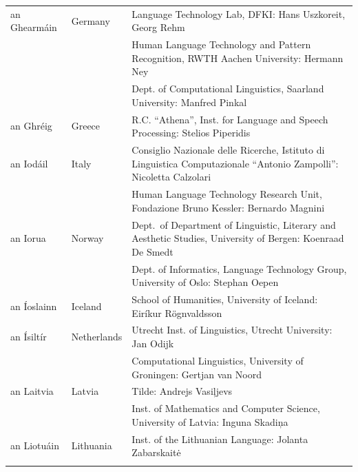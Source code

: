 \begin{longtable}{@{}llp{113mm}@{}}
  an Ghearmáin  & \textcolor{grey1}{Germany} & Language Technology Lab, DFKI: Hans Uszkoreit, Georg Rehm\\ \addlinespace
  & & Human Language Technology and Pattern Recognition, RWTH Aachen University: Hermann Ney \\ \addlinespace
  & & Dept. of Computational Linguistics, Saarland University: Manfred Pinkal\\ \addlinespace
   
  an Ghréig & \textcolor{grey1}{Greece} & R.C. “Athena”, Inst. for Language and Speech Processing: Stelios Piperidis\\ \addlinespace
  
  an Iodáil & \textcolor{grey1}{Italy} & Consiglio Nazionale delle Ricerche, Istituto di Linguistica Computazionale “Antonio Zampolli”: Nicoletta Calzolari\\ \addlinespace
  & & Human Language Technology Research Unit, Fondazione Bruno Kessler: \newline Bernardo Magnini\\ \addlinespace
 
  an Iorua & \textcolor{grey1}{Norway} & Dept.~of Department of Linguistic, Literary and Aesthetic Studies, University of Bergen: Koenraad De Smedt\\ \addlinespace 
  & & Dept. of Informatics, Language Technology Group, University of Oslo: \newline Stephan Oepen \\ \addlinespace
  
  an Íoslainn & \textcolor{grey1}{Iceland} & School of Humanities, University of Iceland: Eiríkur Rögnvaldsson\\ \addlinespace
  
  an Ísiltír & \textcolor{grey1}{Netherlands} & Utrecht Inst. of Linguistics, Utrecht University: Jan Odijk\\ \addlinespace 
  & & Computational Linguistics, University of Groningen: Gertjan van Noord\\ \addlinespace
   
  an Laitvia & \textcolor{grey1}{Latvia} & Tilde: Andrejs Vasiļjevs\\ \addlinespace 
  & & Inst. of Mathematics and Computer Science, University of Latvia: Inguna Skadiņa\\ \addlinespace
  
  an Liotuáin & \textcolor{grey1}{Lithuania} & Inst. of the Lithuanian Language: Jolanta Zabarskaitė\\ \addlinespace
  

\end{longtable}
